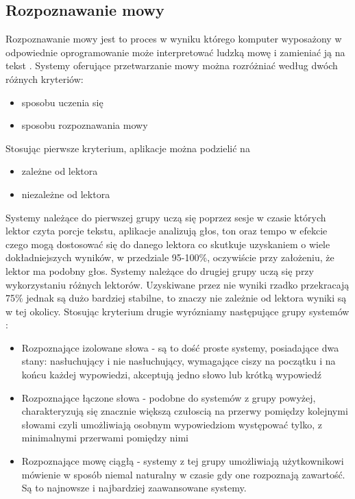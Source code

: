 \subsection{Rozpoznawanie mowy}
Rozpoznawanie mowy jest to proces w wyniku którego komputer wyposażony w odpowiednie oprogramowanie może interpretować ludzką mowę i zamieniać ją na tekst \cite{douglas2002}. Systemy oferujące przetwarzanie mowy można rozróżniać	 według dwóch różnych kryteriów:
\begin{itemize}
	\item sposobu uczenia się
	\item sposobu rozpoznawania mowy
\end{itemize}
Stosując pierwsze kryterium, aplikacje można podzielić na
\begin{itemize}
	\item zależne od lektora
	\item niezależne od lektora
\end{itemize}
Systemy należące do pierwszej grupy uczą się poprzez sesje w czasie których lektor czyta porcje tekstu, aplikacje analizują głos, ton oraz tempo  w efekcie czego mogą dostosować się do danego lektora co skutkuje uzyskaniem o wiele dokładniejszych wyników, w przedziale 95-100\%, oczywiście przy założeniu, że lektor ma podobny głos.  Systemy należące do drugiej grupy uczą się przy wykorzystaniu różnych lektorów. Uzyskiwane przez nie wyniki rzadko przekracają 75\% jednak są dużo bardziej stabilne, to znaczy nie zależnie od lektora wyniki są w tej okolicy. 
Stosując kryterium drugie wyrózniamy następujące grupy systemów \cite{gaikwad2010} :
\begin{itemize}
	\item Rozpoznające izolowane słowa - są to dość proste systemy, posiadające dwa stany: nasłuchujący i nie nasłuchujący,  wymagające ciszy na początku i na końcu każdej wypowiedzi,  akceptują jedno słowo lub krótką wypowiedź 
	\item Rozpoznające łączone słowa - podobne do systemów z grupy powyżej, charakteryzują się znacznie większą czułoscią na przerwy pomiędzy kolejnymi słowami czyli umożliwiają osobnym wypowiedziom występować tylko, z minimalnymi przerwami pomiędzy nimi
	\item Rozpoznające mowę ciągłą -  systemy z tej grupy umożliwiają użytkownikowi mówienie w sposób niemal naturalny w czasie gdy one rozpoznają zawartość. Są to najnowsze i najbardziej zaawansowane systemy.
\end{itemize}
